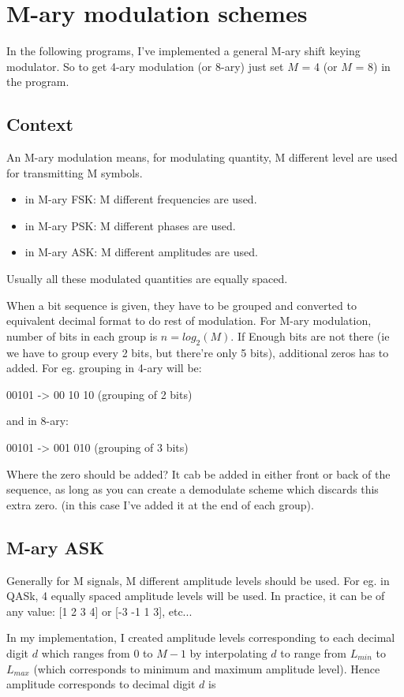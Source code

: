 \chapter{M-ary modulation schemes}
\label{mary}
In the following programs, I've implemented a general M-ary shift keying modulator.
So to get 4-ary modulation (or 8-ary) just set $M$ = 4 (or $M$ = 8) in the program.

\section{Context}
An M-ary modulation means, for modulating quantity, M different level are used for transmitting M symbols.
\begin{itemize}
	\item in M-ary FSK: M different frequencies are used.
	\item in M-ary PSK: M different phases are used.
	\item in M-ary ASK: M different amplitudes are used.
\end{itemize}

Usually all these modulated quantities are equally spaced.

When a bit sequence is given, they have to be grouped and converted to equivalent decimal format to do rest of modulation.
For M-ary modulation, number of bits in each group is $n = log_2(M)$.
If Enough bits are not there (ie we have to group every 2 bits, but there're only 5 bits), additional zeros has to added. For eg. grouping in 4-ary will be:

00101 -> 00 10 10 (grouping of 2 bits)

and in 8-ary:

00101 -> 001 010 (grouping of 3 bits)

Where the zero should be added?
It cab be added in either front or back of the sequence, as long as you can create a demodulate scheme which discards this extra zero.
(in this case I've added it at the end of each group).

\section{M-ary ASK}
Generally for M signals, M different amplitude levels should be used.
For eg. in QASk, 4 equally spaced amplitude levels will be used. In practice, it can be of any value: [1 2 3 4] or [-3 -1 1 3], etc...

In my implementation, I created amplitude levels corresponding to each decimal digit $d$ which ranges from 0 to $M-1$ by interpolating $d$ to range from $L_{min}$ to $L_{max}$
(which corresponds to minimum and maximum amplitude level). Hence amplitude corresponds to decimal digit $d$ is

